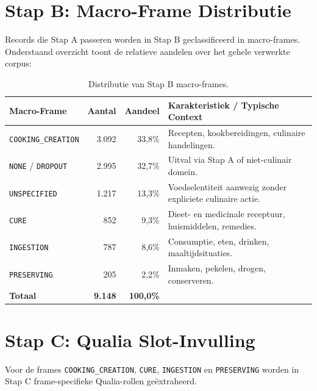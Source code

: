 \documentclass[a4paper,11pt]{article}
\begin{document}
\section{Stap B: Macro-Frame Distributie}

Records die Stap A passeren worden in Stap B geclassificeerd in macro-frames. Onderstaand overzicht toont de relatieve aandelen over het gehele verwerkte corpus:

\begin{table}[h!]
\centering
\begin{tabular}{lrrp{6.5cm}}
\toprule
\textbf{Macro-Frame} & \textbf{Aantal} & \textbf{Aandeel} & \textbf{Karakteristiek / Typische Context} \\
\midrule
\texttt{COOKING\_CREATION} & 3.092 & 33,8\% & Recepten, kookbereidingen, culinaire handelingen. \\
\texttt{NONE} / \texttt{DROPOUT} & 2.995 & 32,7\% & Uitval via Stap A of niet-culinair domein. \\
\texttt{UNSPECIFIED} & 1.217 & 13,3\% & Voedselentiteit aanwezig zonder expliciete culinaire actie. \\
\texttt{CURE} & 852 & 9,3\% & Dieet- en medicinale receptuur, huismiddelen, remedies. \\
\texttt{INGESTION} & 787 & 8,6\% & Consumptie, eten, drinken, maaltijdsituaties. \\
\texttt{PRESERVING} & 205 & 2,2\% & Inmaken, pekelen, drogen, conserveren. \\
\midrule
\textbf{Totaal} & \textbf{9.148} & \textbf{100,0\%} & \\
\bottomrule
\end{tabular}
\caption{Distributie van Stap B macro-frames.}
\end{table}

\newpage

\section{Stap C: Qualia Slot-Invulling}

Voor de frames \texttt{COOKING\_CREATION}, \texttt{CURE}, \texttt{INGESTION} en \texttt{PRESERVING} worden in Stap C frame-specifieke Qualia-rollen geëxtraheerd.
\end{document}
